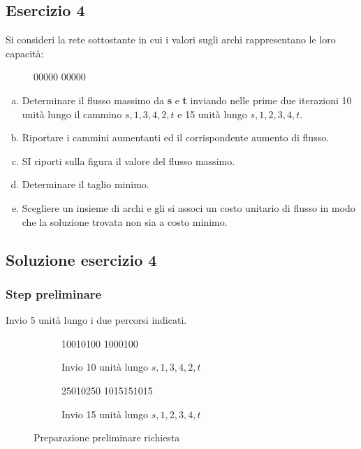 \documentclass[\main/main.tex]{subfiles}
\begin{document}
\subsection{Esercizio 4}
Si consideri la rete sottostante in cui i valori sugli archi rappresentano le loro capacità:

\begin{figure}
  \currentGraphPreloader
  {0}{0}{0}{0}{0}
  {0}{0}{0}{0}{0}
  {\blackFlag}{\blackFlag}{\blackFlag}{\blackFlag}{\blackFlag}
  {\blackFlag}{\blackFlag}{\blackFlag}{\blackFlag}{\blackFlag}
\end{figure}

\begin{enumerate}[a)]
  \item Determinare il flusso massimo da \textbf{s} e \textbf{t} inviando nelle prime due iterazioni 10 unità lungo il cammino $s,1,3,4,2,t$ e 15 unità lungo $s,1,2,3,4,t$.
  \item Riportare i cammini aumentanti ed il corrispondente aumento di flusso.
  \item SI riporti sulla figura il valore del flusso massimo.
  \item Determinare il taglio minimo.
  \item Scegliere un insieme di archi e gli si associ un costo unitario di flusso in modo che la soluzione trovata non sia a costo minimo.
\end{enumerate}

\subsection{Soluzione esercizio 4}
\subsubsection*{Step preliminare}
Invio 5 unità lungo i due percorsi indicati.

\begin{figure}
  \begin{subfigure}{0.49\textwidth}
    \currentGraphPreloader
    {10}{0}{10}{10}{0}
    {10}{0}{0}{10}{0}
    {\redFlag}{\blackFlag}{\redFlag}{\redFlag}{\blackFlag}
    {\redFlag}{\blackFlag}{\blackFlag}{\redFlag}{\blackFlag}
    \caption{Invio 10 unità lungo $s,1,3,4,2,t$}
  \end{subfigure}
  \begin{subfigure}{0.49\textwidth}
    \currentGraphPreloader
    {25}{0}{10}{25}{0}
    {10}{15}{15}{10}{15}
    {\redFlag}{\blackFlag}{\blackFlag}{\redFlag}{\blackFlag}
    {\blackFlag}{\redFlag}{\redFlag}{\blackFlag}{\redFlag}
    \caption{Invio 15 unità lungo $s,1,2,3,4,t$}
  \end{subfigure}
  \caption{Preparazione preliminare richiesta}
\end{figure}
\end{document}
